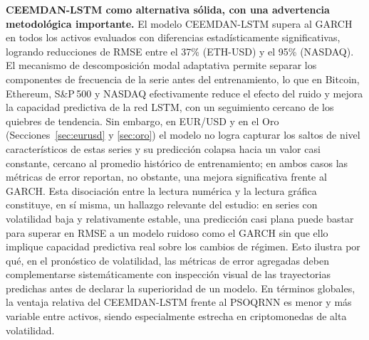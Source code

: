 \documentclass[12pt]{paper}
\begin{document}
\textbf{CEEMDAN-LSTM como alternativa sólida, con una advertencia metodológica importante.} El modelo CEEMDAN-LSTM supera al GARCH en todos los activos evaluados con diferencias estadísticamente significativas, logrando reducciones de RMSE entre el 37\% (ETH-USD) y el 95\% (NASDAQ). El mecanismo de descomposición modal adaptativa permite separar los componentes de frecuencia de la serie antes del entrenamiento, lo que en Bitcoin, Ethereum, S\&P\,500 y NASDAQ efectivamente reduce el efecto del ruido y mejora la capacidad predictiva de la red LSTM, con un seguimiento cercano de los quiebres de tendencia. Sin embargo, en EUR/USD y en el Oro (Secciones~\ref{sec:eurusd} y \ref{sec:oro}) el modelo no logra capturar los saltos de nivel característicos de estas series y su predicción colapsa hacia un valor casi constante, cercano al promedio histórico de entrenamiento; en ambos casos las métricas de error reportan, no obstante, una mejora significativa frente al GARCH. Esta disociación entre la lectura numérica y la lectura gráfica constituye, en sí misma, un hallazgo relevante del estudio: en series con volatilidad baja y relativamente estable, una predicción casi plana puede bastar para superar en RMSE a un modelo ruidoso como el GARCH sin que ello implique capacidad predictiva real sobre los cambios de régimen. Esto ilustra por qué, en el pronóstico de volatilidad, las métricas de error agregadas deben complementarse sistemáticamente con inspección visual de las trayectorias predichas antes de declarar la superioridad de un modelo. En términos globales, la ventaja relativa del CEEMDAN-LSTM frente al PSOQRNN es menor y más variable entre activos, siendo especialmente estrecha en criptomonedas de alta volatilidad.
\end{document}
